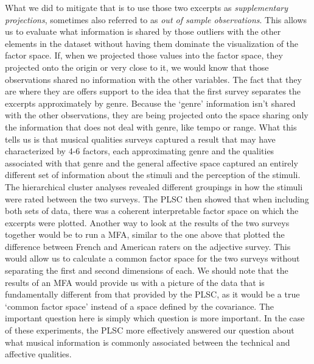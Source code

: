 \documentclass[
  english,
  man,floatsintext]{apa6}
\begin{document}
What we did to mitigate that is to use those two excerpts as \emph{supplementary projections}, sometimes also referred to as \emph{out of sample observations}. This allows us to evaluate what information is shared by those outliers with the other elements in the dataset without having them dominate the visualization of the factor space. If, when we projected those values into the factor space, they projected onto the origin or very close to it, we would know that those observations shared no information with the other variables. The fact that they are where they are offers support to the idea that the first survey separates the excerpts approximately by genre. Because the `genre' information isn't shared with the other observations, they are being projected onto the space sharing only the information that does not deal with genre, like tempo or range. What this tells us is that musical qualities surveys captured a result that may have characterized by 4-6 factors, each approximating genre and the qualities associated with that genre and the general affective space captured an entirely different set of information about the stimuli and the perception of the stimuli.\\
The hierarchical cluster analyses revealed different groupings in how the stimuli were rated between the two surveys. The PLSC then showed that when including both sets of data, there was a coherent interpretable factor space on which the excerpts were plotted. Another way to look at the results of the two surveys together would be to run a MFA, similar to the one above that plotted the difference between French and American raters on the adjective survey. This would allow us to calculate a common factor space for the two surveys without separating the first and second dimensions of each. We should note that the results of an MFA would provide us with a picture of the data that is fundamentally different from that provided by the PLSC, as it would be a true `common factor space' instead of a space defined by the covariance. The important question here is simply which question is more important. In the case of these experiments, the PLSC more effectively answered our question about what musical information is commonly associated between the technical and affective qualities.\\
\end{document}

